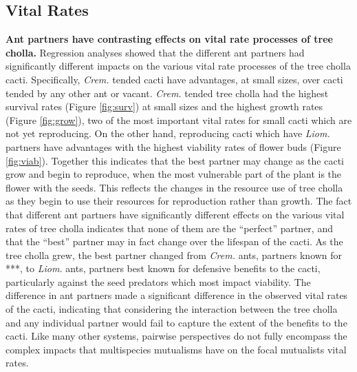 \documentclass[12pt,a4paper]{article}
\begin{document}
\subsection*{Vital Rates}
\textbf{Ant partners have contrasting effects on vital rate processes of tree cholla.}
Regression analyses showed that the different ant partners had significantly different impacts on the various vital rate processes of the tree cholla cacti. 
Specifically, \textit{Crem.} tended cacti have advantages, at small sizes, over cacti tended by any other ant or vacant. 
\textit{Crem.} tended tree cholla had the highest survival rates (Figure \ref{fig:surv})  at small sizes and the highest growth rates (Figure \ref{fig:grow}), two of the most important vital rates for small cacti which are not yet reproducing. 
On the other hand, reproducing cacti which have \textit{Liom.} partners  have advantages with the highest viability rates of flower buds (Figure \ref{fig:viab}). 
Together this indicates that the best partner may change as the cacti grow and begin to reproduce, when the most vulnerable part of the plant is the flower with the seeds. 
This reflects the changes in the resource use of tree cholla as they begin to use their resources for reproduction rather than growth. 
The fact that different ant partners have significantly different effects on the various vital rates of tree cholla indicates that none of them are the “perfect” partner, and that the “best” partner may in fact change over the lifespan of the cacti. 
As the tree cholla grew, the best partner changed from \textit{Crem.} ants, partners known for ***, to \textit{Liom.} ants, partners best known for defensive benefits to the cacti, particularly against the seed predators which most impact viability. 
The difference in ant partners made a significant difference in the observed vital rates of the cacti, indicating that considering the interaction between the tree cholla and any individual partner would fail to capture the extent of the benefits to the cacti.
Like many other systems, pairwise perspectives do not fully encompass the complex impacts that multispecies mutualisms have on the focal mutualists vital rates.
\end{document}
